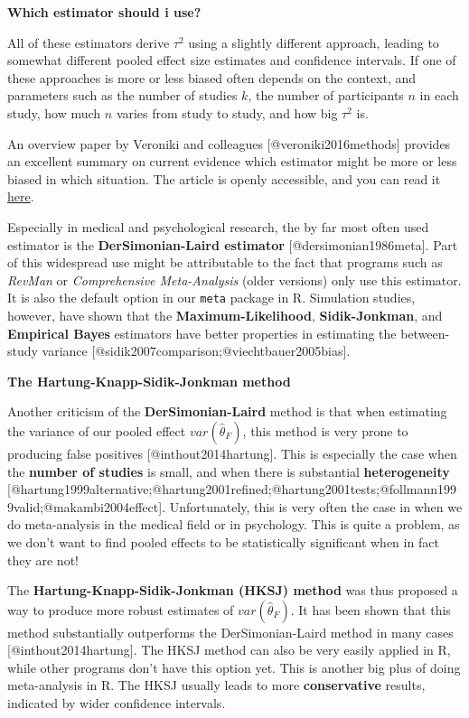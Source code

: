 \documentclass[]{book}
\theoremstyle{definition}
\theoremstyle{definition}
\theoremstyle{definition}
\theoremstyle{remark}
\begin{document}
\begin{rmdinfo}
\textbf{Which estimator should i use?}

All of these estimators derive \(\tau^{2}\) using a slightly different
approach, leading to somewhat different pooled effect size estimates and
confidence intervals. If one of these approaches is more or less biased
often depends on the context, and parameters such as the number of
studies \(k\), the number of participants \(n\) in each study, how much
\(n\) varies from study to study, and how big \(\tau^{2}\) is.

An overview paper by Veroniki and colleagues {[}@veroniki2016methods{]}
provides an excellent summary on current evidence which estimator might
be more or less biased in which situation. The article is openly
accessible, and you can read it
\href{https://www.ncbi.nlm.nih.gov/pmc/articles/PMC4950030/}{here}.

Especially in medical and psychological research, the by far most often
used estimator is the \textbf{DerSimonian-Laird estimator}
{[}@dersimonian1986meta{]}. Part of this widespread use might be
attributable to the fact that programs such as \emph{RevMan} or
\emph{Comprehensive Meta-Analysis} (older versions) only use this
estimator. It is also the default option in our \texttt{meta} package in
R. Simulation studies, however, have shown that the
\textbf{Maximum-Likelihood}, \textbf{Sidik-Jonkman}, and
\textbf{Empirical Bayes} estimators have better properties in estimating
the between-study variance
{[}@sidik2007comparison;@viechtbauer2005bias{]}.
\end{rmdinfo}

\begin{rmdinfo}
\textbf{The Hartung-Knapp-Sidik-Jonkman method}

Another criticism of the \textbf{DerSimonian-Laird} method is that when
estimating the variance of our pooled effect \(var(\hat\theta_F)\), this
method is very prone to producing false positives
{[}@inthout2014hartung{]}. This is especially the case when the
\textbf{number of studies} is small, and when there is substantial
\textbf{heterogeneity}
{[}@hartung1999alternative;@hartung2001refined;@hartung2001tests;@follmann1999valid;@makambi2004effect{]}.
Unfortunately, this is very often the case in when we do meta-analysis
in the medical field or in psychology. This is quite a problem, as we
don't want to find pooled effects to be statistically significant when
in fact they are not!

The \textbf{Hartung-Knapp-Sidik-Jonkman (HKSJ) method} was thus proposed
a way to produce more robust estimates of \(var(\hat\theta_F)\). It has
been shown that this method substantially outperforms the
DerSimonian-Laird method in many cases {[}@inthout2014hartung{]}. The
HKSJ method can also be very easily applied in R, while other programs
don't have this option yet. This is another big plus of doing
meta-analysis in R. The HKSJ usually leads to more \textbf{conservative}
results, indicated by wider confidence intervals.
\end{rmdinfo}
\end{document}
